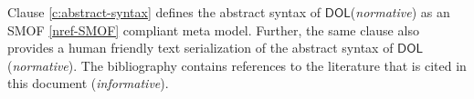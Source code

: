 \documentclass[10pt, a4paper]{isov2}
\newcommand*{\DOL}{\ensuremath{\mathsf{DOL}}\xspace}
\renewcommand{\noterefname}{note}
\renewcommand{\nref}[1]{\noterefname~\ref{#1}}
\renewcommand{\nref}[1]{\ref{nref-#1}}
\begin{document}
\medskip \noindent
Clause \ref{c:abstract-syntax} defines the abstract syntax of \DOL (\emph{normative}) as an SMOF \nref{SMOF} compliant meta model.
Further,  the same clause also provides a human friendly text serialization of the abstract syntax of
\DOL (\emph{normative}).
%
%
%
%
%
%
%
%
%
%
\medskip \noindent
The bibliography %
contains references to the literature that is cited in this document
(\emph{informative}).
\end{document}
